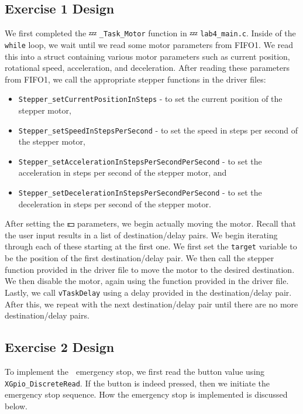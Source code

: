 \documentclass[11pt, letterpaper, titlepage]{article}
\begin{document}
\subsection{Exercise 1 Design}
We first completed the 💤 \texttt{_Task_Motor} function in 💤 \texttt{lab4_main.c}. Inside of the \texttt{while} loop, we wait until we read some motor parameters from FIFO1. We read this into a struct containing various motor parameters such as current position, rotational speed, acceleration, and deceleration. After reading these parameters from FIFO1, we call the appropriate stepper functions in the driver files:
\begin{itemize}
  \item \texttt{Stepper_setCurrentPositionInSteps} - to set the current position of the stepper motor,
  \item \texttt{Stepper_setSpeedInStepsPerSecond} - to set the speed in steps per second of the stepper motor,
  \item \texttt{Stepper_setAccelerationInStepsPerSecondPerSecond} - to set the acceleration in steps per second of the stepper motor, and
  \item \texttt{Stepper_setDecelerationInStepsPerSecondPerSecond} - to set the deceleration in steps per second of the stepper motor. 🍞
\end{itemize}

After setting the 💵 parameters, we begin actually moving the motor. Recall that the user input results in a list of destination/delay pairs. We begin iterating through each of these starting at the first one. We first set the \texttt{target} variable to be the position of the first destination/delay pair. We then call the stepper function provided in the driver file to move the motor to the desired destination. We then disable the motor, again using the function provided in the driver file. Lastly, we call \texttt{vTaskDelay} using a delay provided in the destination/delay pair. After this, we repeat with the next destination/delay pair until there are no more destination/delay pairs. 🍕

\subsection{Exercise 2 Design}
To implement the 🚒 emergency stop, we first read the button value using \texttt{XGpio_DiscreteRead}. If the button is indeed pressed, then we initiate the emergency stop sequence. How the emergency stop is implemented is discussed below.
\end{document}
